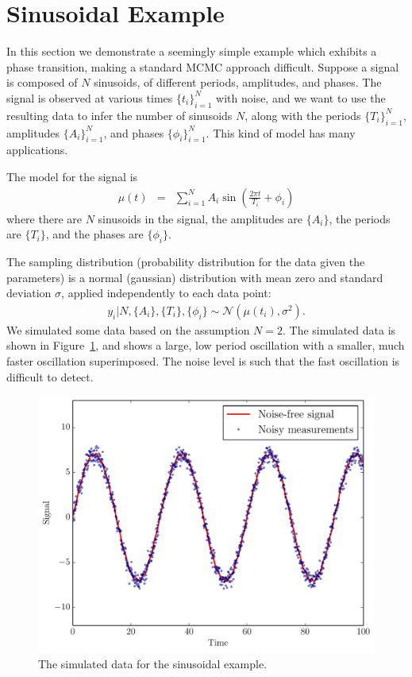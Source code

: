 \documentclass[letterpaper, 11pt]{article}
\begin{document}
\section{Sinusoidal Example}
In this section we demonstrate a seemingly simple example which exhibits
a phase transition, making a standard MCMC approach difficult. Suppose
a signal is composed of $N$ sinusoids, of different periods, amplitudes,
and phases. The signal is observed at various times $\{t_i\}_{i=1}^N$ with
noise, and we want to use the resulting data to infer the number of sinusoids
$N$, along with the periods $\{T_i\}_{i=1}^N$, amplitudes $\{A_i\}_{i=1}^N$,
and phases $\{\phi_i\}_{i=1}^N$.
This kind of model has many applications\citep[see e.g.][]{bretthorst}.

The model for the signal is
\begin{eqnarray}
\mu(t) &=& \sum_{i=1}^N A_i \sin \left(\frac{2\pi t}{T_i} + \phi_i\right)
\end{eqnarray}
where there are $N$ sinusoids in the signal, the
amplitudes are $\{A_i\}$, the periods are $\{T_i\}$, and the phases are
$\{\phi_i\}$.

The sampling distribution (probability distribution for the data given the
parameters) is a normal (gaussian) distribution with mean zero and standard
deviation $\sigma$, applied independently to each data point:
\begin{eqnarray}
y_i | N, \{A_i\}, \{T_i\}, \{\phi_i\} \sim
\mathcal{N}\left(\mu(t_i), \sigma^2\right).
\end{eqnarray}
We simulated some data based on the assumption $N=2$.
The simulated data is shown in Figure~\ref{fig:sinewave_data}, and shows a
large, low period oscillation with a smaller, much faster oscillation
superimposed. The noise level is such that the fast oscillation is difficult
to detect.

\begin{figure}
\begin{center}
\includegraphics[scale=0.5]{sinewave_data.pdf}
\caption{The simulated data for the sinusoidal example.
\label{fig:sinewave_data}}
\end{center}
\end{figure}
\end{document}
